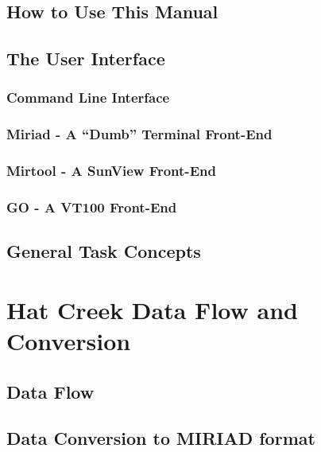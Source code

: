 \chapter		{How to Use This Manual}

\cleardoublepage
\chapter		{The User Interface}
 

 \newpage
 \section		{Command Line Interface}
 

 \newpage
 \section		{Miriad - A ``Dumb'' Terminal Front-End}
 

 \newpage
 \section		{Mirtool - A SunView Front-End}
 

 \newpage
 \section		{GO - A VT100 Front-End}
 
\cleardoublepage
\chapter		{General Task Concepts}

\cleardoublepage
\part{Hat Creek Data Flow and Conversion}
\chapter		{Data Flow}
 
\cleardoublepage
\chapter		{Data Conversion to MIRIAD format}
 
\cleardoublepage
